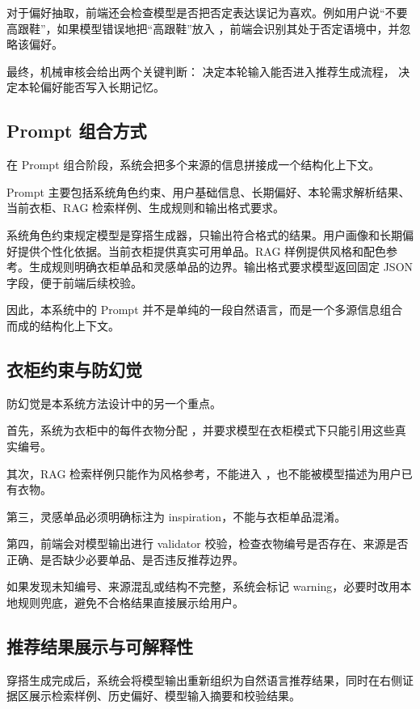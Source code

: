 \documentclass{applemlr}
\begin{document}
对于偏好抽取，前端还会检查模型是否把否定表达误记为喜欢。例如用户说``不要高跟鞋''，如果模型错误地把``高跟鞋''放入 ，前端会识别其处于否定语境中，并忽略该偏好。

最终，机械审核会给出两个关键判断： 决定本轮输入能否进入推荐生成流程， 决定本轮偏好能否写入长期记忆。

\subsection{Prompt 组合方式}

在 Prompt 组合阶段，系统会把多个来源的信息拼接成一个结构化上下文。

Prompt 主要包括系统角色约束、用户基础信息、长期偏好、本轮需求解析结果、当前衣柜、RAG 检索样例、生成规则和输出格式要求。

系统角色约束规定模型是穿搭生成器，只输出符合格式的结果。用户画像和长期偏好提供个性化依据。当前衣柜提供真实可用单品。RAG 样例提供风格和配色参考。生成规则明确衣柜单品和灵感单品的边界。输出格式要求模型返回固定 JSON 字段，便于前端后续校验。

因此，本系统中的 Prompt 并不是单纯的一段自然语言，而是一个多源信息组合而成的结构化上下文。

\subsection{衣柜约束与防幻觉}

防幻觉是本系统方法设计中的另一个重点。

首先，系统为衣柜中的每件衣物分配 ，并要求模型在衣柜模式下只能引用这些真实编号。

其次，RAG 检索样例只能作为风格参考，不能进入 ，也不能被模型描述为用户已有衣物。

第三，灵感单品必须明确标注为 inspiration，不能与衣柜单品混淆。

第四，前端会对模型输出进行 validator 校验，检查衣物编号是否存在、来源是否正确、是否缺少必要单品、是否违反推荐边界。

如果发现未知编号、来源混乱或结构不完整，系统会标记 warning，必要时改用本地规则兜底，避免不合格结果直接展示给用户。

\subsection{推荐结果展示与可解释性}

穿搭生成完成后，系统会将模型输出重新组织为自然语言推荐结果，同时在右侧证据区展示检索样例、历史偏好、模型输入摘要和校验结果。
\end{document}
